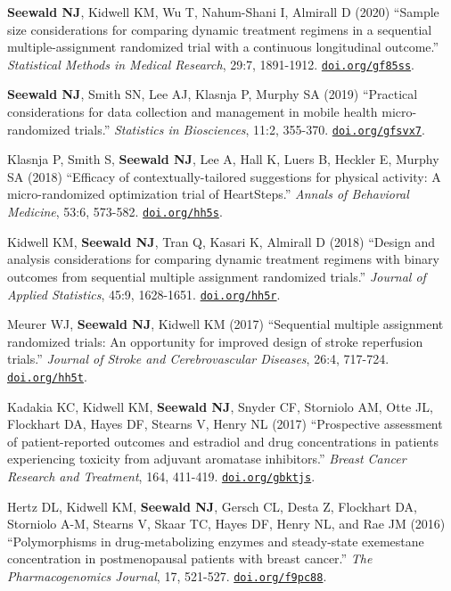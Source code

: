 \documentclass[letterpaper,11pt]{article} %
\begin{document}
\begin{etaremune}
        \item\textbf{Seewald NJ}, Kidwell KM, Wu T, Nahum-Shani I, Almirall D (2020) ``Sample size considerations for comparing dynamic treatment regimens in a sequential multiple-assignment randomized trial with a continuous longitudinal outcome.'' \textit{Statistical Methods in Medical Research}, 29:7, 1891-1912. \href{https://doi.org/gf85ss}{\texttt{doi.org/gf85ss}}.
        
		\item \textbf{Seewald NJ}, Smith SN, Lee AJ, Klasnja P, Murphy SA (2019) ``Practical considerations for data collection and management in mobile health micro-randomized trials.'' \textit{Statistics in Biosciences}, 11:2, 355-370. \href{https://doi.org/gfsvx7}{\texttt{doi.org/gfsvx7}}.
		
		\item Klasnja P, Smith S, \textbf{Seewald NJ}, Lee A, Hall K, Luers B, Heckler E, Murphy SA (2018) ``Efficacy of contextually-tailored suggestions for physical activity: A micro-randomized optimization trial of HeartSteps.'' \textit{Annals of Behavioral Medicine}, 53:6, 573-582. \href{https://doi.org/hh5s}{\texttt{doi.org/hh5s}}.
			
		\item Kidwell KM, \textbf{Seewald NJ}, Tran Q, Kasari K, Almirall D (2018) ``Design and analysis considerations for comparing dynamic treatment regimens with binary outcomes from sequential multiple assignment randomized trials.'' \textit{Journal of Applied Statistics}, 45:9, 1628-1651. \href{https://doi.org/hh5r}{\texttt{doi.org/hh5r}}.
		
		\item Meurer WJ, \textbf{Seewald NJ}, Kidwell KM (2017) ``Sequential multiple assignment randomized trials: An opportunity for improved design of stroke reperfusion trials.'' \textit{Journal of Stroke and Cerebrovascular Diseases}, 26:4, 717-724. \href{https://doi.org/hh5t}{\texttt{doi.org/hh5t}}.
			
		\item Kadakia KC, Kidwell KM, \textbf{Seewald NJ}, Snyder CF, Storniolo AM, Otte JL, Flockhart DA, Hayes DF, Stearns V, Henry NL (2017) ``Prospective assessment of patient-reported outcomes and estradiol and drug concentrations in patients experiencing toxicity from adjuvant aromatase inhibitors.'' \textit{Breast Cancer Research and Treatment}, 164, 411-419. \href{https://doi.org/gbktjs}{\texttt{doi.org/gbktjs}}.

		\item Hertz DL, Kidwell KM, \textbf{Seewald NJ}, Gersch CL, Desta Z, Flockhart DA, Storniolo A-M, Stearns V, Skaar TC, Hayes DF, Henry NL, and Rae JM (2016) ``Polymorphisms in drug-metabolizing enzymes and steady-state exemestane concentration in postmenopausal patients with breast cancer.'' \textit{The Pharmacogenomics Journal}, 17, 521-527. \href{https://doi.org/f9pc88}{\texttt{doi.org/f9pc88}}.
			

\end{etaremune}
\end{document}
